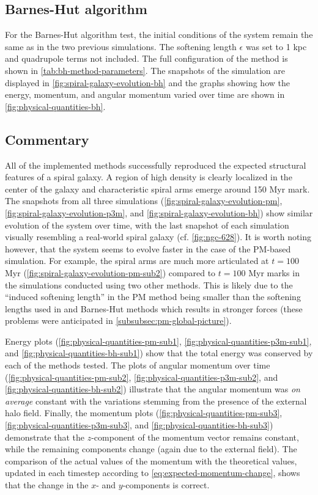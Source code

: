 \subsection{Barnes-Hut algorithm}
For the Barnes-Hut algorithm test, the initial conditions of the system remain the same as in the two previous simulations.
The softening length $\epsilon$ was set to 1 kpc and quadrupole terms not included.
The full configuration of the method is shown in \autoref{tab:bh-method-parameters}.
The snapshots of the simulation are displayed in \autoref{fig:spiral-galaxy-evolution-bh} and the graphs showing how the energy, momentum, and angular momentum varied over time are shown in \autoref{fig:physical-quantities-bh}.

\subsection{Commentary}
All of the implemented methods successfully reproduced the expected structural features of a spiral galaxy.
A region of high density is clearly localized in the center of the galaxy and characteristic spiral arms emerge around 150 Myr mark.
The snapshots from all three simulations (\autoref{fig:spiral-galaxy-evolution-pm}, \autoref{fig:spiral-galaxy-evolution-p3m}, and \autoref{fig:spiral-galaxy-evolution-bh}) show similar evolution of the system over time, with the last snapshot of each simulation visually resembling a real-world spiral galaxy (cf. \autoref{fig:ngc-628}).
It is worth noting however, that the system seems to evolve faster in the case of the PM-based simulation.
For example, the spiral arms are much more articulated at $t=100$ Myr (\autoref{fig:spiral-galaxy-evolution-pm-sub2}) compared to $t=100$ Myr marks in the simulations conducted using two other methods.
This is likely due to the ``induced softening length'' in the PM method being smaller than the softening lengths used in \PThreeM{} and Barnes-Hut methods which results in stronger forces (these problems were anticipated in \autoref{subsubsec:pm-global-picture}).

Energy plots (\autoref{fig:physical-quantities-pm-sub1}, \autoref{fig:physical-quantities-p3m-sub1}, and \autoref{fig:physical-quantities-bh-sub1}) show that the total energy was conserved by each of the methods tested.
The plots of angular momentum over time (\autoref{fig:physical-quantities-pm-sub2}, \autoref{fig:physical-quantities-p3m-sub2}, and \autoref{fig:physical-quantities-bh-sub2}) illustrate that the angular momentum was \textit{on average} constant with the variations stemming from the presence of the external halo field.
Finally, the momentum plots (\autoref{fig:physical-quantities-pm-sub3}, \autoref{fig:physical-quantities-p3m-sub3}, and \autoref{fig:physical-quantities-bh-sub3}) demonstrate that the $z$-component of the momentum vector remains constant, while the remaining components change (again due to the external field).
The comparison of the actual values of the momentum with the theoretical values, updated in each timestep according to \autoref{eq:expected-momentum-change}, shows that the change in the $x$- and $y$-components is correct.
